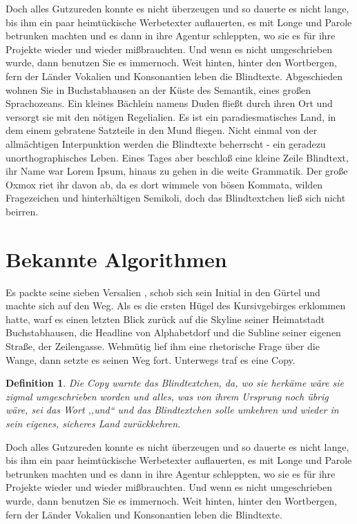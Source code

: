 \documentclass[12pt,a4paper,twoside]{scrartcl}
\newtheorem{Definition}[Satz]{Definition}
\numberwithin{equation}{section}
\begin{document}
Doch alles Gutzureden konnte es nicht überzeugen und so dauerte es nicht lange, bis ihm ein paar heimtückische Werbetexter auflauerten, es mit Longe und Parole betrunken machten und es dann in ihre Agentur schleppten, wo sie es für ihre Projekte wieder und wieder mißbrauchten. Und wenn es nicht umgeschrieben wurde, dann benutzen Sie es immernoch. Weit hinten, hinter den Wortbergen, fern der Länder Vokalien und Konsonantien leben die Blindtexte. Abgeschieden wohnen Sie in Buchstabhausen an der Küste des Semantik, eines großen Sprachozeans. Ein kleines Bächlein namens Duden fließt durch ihren Ort und versorgt sie mit den nötigen Regelialien. Es ist ein paradiesmatisches Land, in dem einem gebratene Satzteile in den Mund fliegen. Nicht einmal von der allmächtigen Interpunktion werden die Blindtexte beherrscht - ein geradezu unorthographisches Leben. Eines Tages aber beschloß eine kleine Zeile Blindtext, ihr Name war Lorem Ipsum, hinaus zu gehen in die weite Grammatik. Der große Oxmox riet ihr davon ab, da es dort wimmele von bösen Kommata, wilden Fragezeichen und hinterhältigen Semikoli, doch das Blindtextchen ließ sich nicht beirren.


\section{Bekannte Algorithmen}

Es packte seine sieben Versalien \cite{Cormen2001introduction}, schob sich sein Initial in den Gürtel und machte sich auf den Weg. Als es die ersten Hügel des Kursivgebirges erklommen hatte, warf es einen letzten Blick zurück auf die Skyline seiner Heimatstadt Buchstabhausen, die Headline von Alphabetdorf und die Subline seiner eigenen Straße, der Zeilengasse. Wehmütig lief ihm eine rhetorische Frage über die Wange, dann setzte es seinen Weg fort. Unterwegs traf es eine Copy.
\begin{Definition}
Die Copy warnte das Blindtextchen, da, wo sie herkäme wäre sie zigmal umgeschrieben worden und alles, was von ihrem Ursprung noch übrig wäre, sei das Wort ,,und`` und das Blindtextchen solle umkehren und wieder in sein eigenes, sicheres Land zurückkehren.
\end{Definition}
Doch alles Gutzureden konnte es nicht überzeugen und so dauerte es nicht lange, bis ihm ein paar heimtückische Werbetexter auflauerten, es mit Longe und Parole betrunken machten und es dann in ihre Agentur schleppten, wo sie es für ihre Projekte wieder und wieder mißbrauchten. Und wenn es nicht umgeschrieben wurde, dann benutzen Sie es immernoch. Weit hinten, hinter den Wortbergen, fern der Länder Vokalien und Konsonantien leben die Blindtexte.
\end{document}
